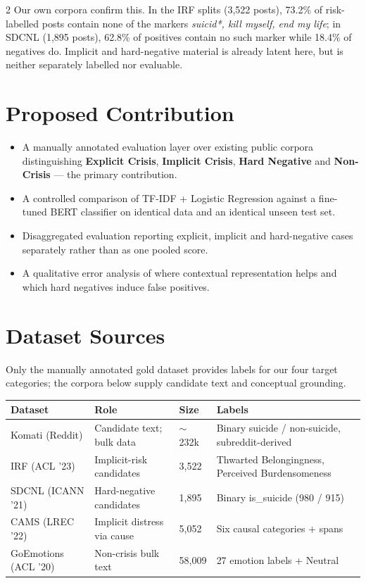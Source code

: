 \documentclass[11pt]{article}
\begin{document}
\begin{multicols}{2}
Our own corpora confirm this. In the IRF splits (3,522 posts), 73.2\% of risk-labelled posts contain none of the markers \textit{suicid*, kill myself, end my life}; in SDCNL (1,895 posts), 62.8\% of positives contain no such marker while 18.4\% of negatives do. Implicit and hard-negative material is already latent here, but is neither separately labelled nor evaluable.

\section{Proposed Contribution}
\begin{itemize}
\item A manually annotated evaluation layer over existing public corpora distinguishing \textbf{Explicit Crisis}, \textbf{Implicit Crisis}, \textbf{Hard Negative} and \textbf{Non-Crisis} --- the primary contribution.
\item A controlled comparison of TF-IDF + Logistic Regression against a fine-tuned BERT classifier on identical data and an identical unseen test set.
\item Disaggregated evaluation reporting explicit, implicit and hard-negative cases separately rather than as one pooled score.
\item A qualitative error analysis of where contextual representation helps and which hard negatives induce false positives.
\end{itemize}

\section{Dataset Sources}
Only the manually annotated gold dataset provides labels for our four target categories; the corpora below supply candidate text and conceptual grounding.

\vspace{2pt}
{\footnotesize
\setlength{\tabcolsep}{3pt}
\begin{tabular}{|p{1.8cm}|p{1.7cm}|p{0.8cm}|p{2.5cm}|}
\hline
\textbf{Dataset} & \textbf{Role} & \textbf{Size} & \textbf{Labels} \\
\hline
Komati (Reddit) & Candidate text; bulk data & $\sim$232k & Binary suicide / non-suicide, subreddit-derived \\
\hline
IRF (ACL '23) & Implicit-risk candidates & 3,522 & Thwarted Belongingness, Perceived Burdensomeness \\
\hline
SDCNL (ICANN '21) & Hard-negative candidates & 1,895 & Binary is\_suicide (980 / 915) \\
\hline
CAMS (LREC '22) & Implicit distress via cause & 5,052 & Six causal categories + spans \\
\hline
GoEmotions (ACL '20) & Non-crisis bulk text & 58,009 & 27 emotion labels + Neutral \\
\hline
\end{tabular}
}


\end{multicols}
\end{document}
